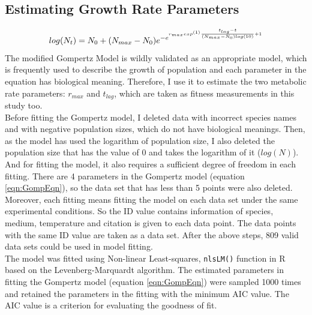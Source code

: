 \documentclass[a4paper]{article}
\begin{document}
\subsection{Estimating Growth Rate Parameters}
\begin{equation} 
\label{eqn:GompEqn}
    log(N_t)= N_0 + (N_{max} - N_0) e^{-e^{r_{max} exp^{(1)}  {\frac{t_{lag}-t}{(N_{max}-N_0)log(10)}\\} +1}}
\end{equation}
The modified Gompertz Model \citep{zwietering1990modeling} is wildly validated as an appropriate model, which is frequently used to describe the growth of population and each parameter in the equation has biological meaning. Therefore, I use it to estimate the two metabolic rate parameters: $r_{max}$ and $t_{lag}$, which are taken as fitness measurements in this study too. \\

Before fitting the Gompertz model, I deleted data with incorrect species names and with negative population sizes, which do not have biological meanings. Then, as the model has used the logarithm of population size, I also deleted the population size that has the value of 0 and takes the logarithm of it ($log(N)$). And for fitting the model, it also requires a sufficient degree of freedom in each fitting. There are 4 parameters in the Gompertz model (equation \ref{eqn:GompEqn}), so the data set that has less than 5 points were also deleted. Moreover, each fitting means fitting the model on each data set under the same experimental conditions. So the ID value contains information of species, medium, temperature and citation is given to each data point. The data points with the same ID value are taken as a data set. After the above steps, 809 valid data sets could be used in model fitting.\\

The model was fitted using Non-linear Least-squares, \texttt{nlsLM()} function in R based on the Levenberg-Marquardt algorithm. The estimated parameters in fitting the Gompertz model (equation \ref{eqn:GompEqn}) were sampled 1000 times and retained the parameters in the fitting with the minimum AIC value. The AIC value is a criterion for evaluating the goodness of fit. \\
\end{document}
